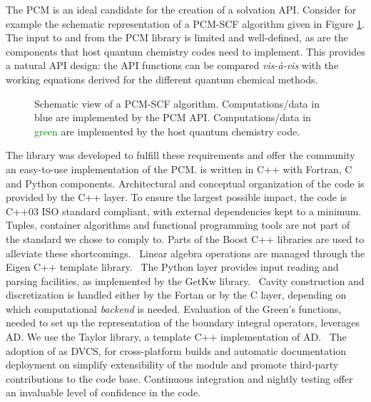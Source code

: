 The \acrshort{PCM} is an ideal candidate for the creation of a solvation
\acrshort{API}. Consider for example the schematic representation of a
\acrshort{PCM}-\acrshort{SCF} algorithm given in Figure \ref{fig:algorithm}.
The input to and from the \acrshort{PCM} library is limited and well-defined,
as are the components that host quantum chemistry codes need to
implement.
This provides a natural \acrshort{API} design: the \acrshort{API} functions can be
compared \emph{vis-à-vis} with the working equations derived for the
different quantum chemical methods.

\begin{figure}[tb]
\centering
\scalebox{0.7}{}
\caption[Modular approach to programming a \acrshort{PCM} functionality into an existing \acrshort{SCF} code.]{
Schematic view of a \acrshort{PCM}-\acrshort{SCF} algorithm. Computations/data in
\textcolor{PMS2229}{blue} are implemented by the \acrshort{PCM} \acrshort{API}.
Computations/data in \textcolor{Green}{green} are implemented by the
host quantum chemistry code.
  }
\label{fig:algorithm}
\end{figure}

The \pcmsolver library was developed to fulfill these requirements and
offer the community an easy-to-use implementation of the
\acrshort{PCM}.\autocite{PCMSolver}
\pcmsolver is written in C++ with Fortran, C and Python components.
Architectural and conceptual organization of the code is provided by the
C++ layer. To ensure the largest possible impact, the code is C++03 ISO standard
compliant, with external dependencies kept to a minimum.
Tuples, container algorithms and functional programming tools are not
part of the standard we chose to comply to.
Parts of the Boost C++ libraries are used to alleviate these
shortcomings.~\autocite{boost}
Linear algebra operations are managed through the Eigen C++ template
library.~\autocite{eigen}
The Python layer provides input reading and parsing facilities,
as implemented by the GetKw library.~\autocite{libgetkw}
Cavity construction and discretization is handled either by the Fortan
or by the C layer, depending on which computational \emph{backend} is
needed.
Evaluation of the Green's functions, needed to set up the representation
of the boundary integral operators, leverages \gls{AD}. We use the Taylor library, a template C++
implementation of \acrshort{AD}.~\autocite{Bartholomew-Biggs2000-db, libtaylor}
The adoption of \git as \acrshort{DVCS}, \cmake for cross-platform builds and
automatic documentation deployment on \readthedocs simplify
extensibility of the module and promote third-party contributions to the
code base. Continuous integration and nightly testing offer an
invaluable level of confidence in the code.


